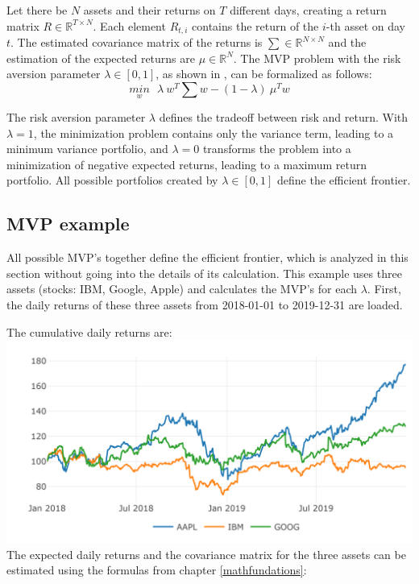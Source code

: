 \documentclass[
  oneside]{book}
\begin{document}
Let there be \(N\) assets and their returns on \(T\) different days, creating a return matrix \(R \in \mathbb{R}^{T \times N}\). Each element \(R_{t,i}\) contains the return of the \(i\)-th asset on day \(t\). The estimated covariance matrix of the returns is \(\textstyle\sum \in \mathbb{R}^{N \times N}\) and the estimation of the expected returns are \(\mu \in \mathbb{R}^{N}\). The MVP problem with the risk aversion parameter \(\lambda \in [0,1]\), as shown in \citep{Mari2005}, can be formalized as follows:
\begin{equation} 
\underset{w}{min} \ \ \ \lambda \ w^T \textstyle\sum w - (1-\lambda) \ \mu^T w
\label{eq:MVP}
\end{equation}

The risk aversion parameter \(\lambda\) defines the tradeoff between risk and return. With \(\lambda = 1\), the minimization problem contains only the variance term, leading to a minimum variance portfolio, and \(\lambda = 0\) transforms the problem into a minimization of negative expected returns, leading to a maximum return portfolio. All possible portfolios created by \(\lambda \in [0, 1]\) define the efficient frontier.

\hypertarget{mvp-example}{%
\subsection{MVP example}\label{mvp-example}}

All possible MVP's together define the efficient frontier, which is analyzed in this section without going into the details of its calculation. This example uses three assets (stocks: IBM, Google, Apple) and calculates the MVP's for each \(\lambda\). First, the daily returns of these three assets from 2018-01-01 to 2019-12-31 are loaded.

The cumulative daily returns are:\\
\includegraphics{Master_Thesis_files/figure-latex/MVP_ex2-1.png}
The expected daily returns and the covariance matrix for the three assets can be estimated using the formulas from chapter \ref{mathfundations}:
\end{document}
